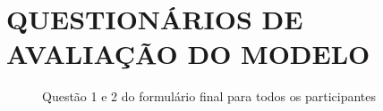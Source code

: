 \documentclass[english,brazilian]{UNISINOSartigo} %
\begin{document}
\section{QUESTIONÁRIOS DE AVALIAÇÃO DO MODELO}

\renewcommand{\thefigure}{E.\arabic{figure}}
\setcounter{figure}{0}

\begin{figure}[ht]
    \caption{Questão 1 e 2 do formulário final para todos os participantes}
    \label{fig:questao1_2_geral}
    \centering
    \footnotesize
    \begin{minipage}{.9\textwidth}
        \centering
    \end{minipage}
\end{figure}
\FloatBarrier
\end{document}
